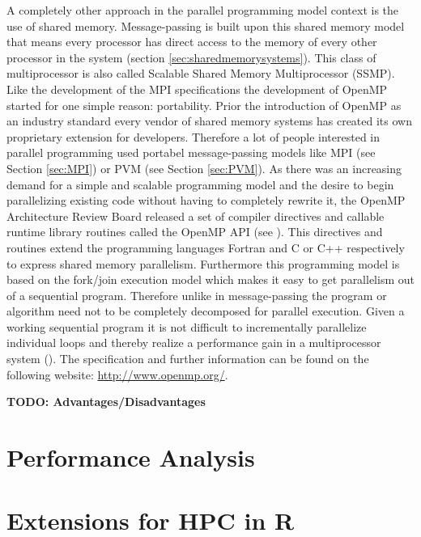 A completely other approach in the parallel programming model context
is the use of shared memory. Message-passing is built upon this shared
memory model that means every processor has direct access to the
memory of every other processor in the system (section \ref{sec:sharedmemorysystems}). This class of
multiprocessor is also called Scalable Shared Memory Multiprocessor
(SSMP). Like the development of the MPI specifications the development
of OpenMP started for one simple reason: portability. Prior the
introduction of OpenMP as an industry standard every vendor of shared
memory systems has created its own proprietary extension for
developers. Therefore a lot of people interested in parallel
programming used portabel message-passing models like MPI (see
Section \ref{sec:MPI}) or PVM (see Section \ref{sec:PVM}). As there
was an increasing demand for a simple and scalable programming model and
the desire to begin parallelizing existing code without having to
completely rewrite it, the OpenMP Architecture Review Board released a
set of compiler directives and callable runtime library routines
called the OpenMP API (see \cite{openMP05}). This directives and routines extend the
programming languages Fortran and C or C++ respectively to express
shared memory parallelism.
Furthermore this programming model is based on the fork/join execution
model which makes it easy to get parallelism out of a sequential
program. Therefore unlike in message-passing the program or algorithm
need not to be completely decomposed for parallel execution. Given a
working sequential program it is not difficult to incrementally
parallelize individual loops and thereby realize a performance gain in
a multiprocessor system (\cite{dagum1997opi}). The specification and
further information can be found on the following website:
\url{http://www.openmp.org/}.

\textbf{TODO: Advantages/Disadvantages}


\section{Performance Analysis}
\label{sec:perf_analysis}



\section{Extensions for HPC in R}
\label{sec:parallel_R}

